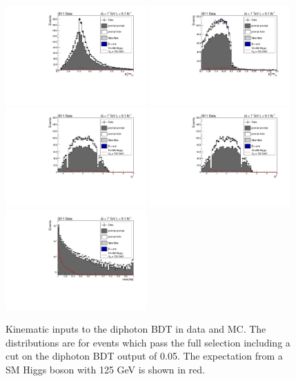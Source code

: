 \begin{figure}[hbt!]
  \includegraphics[width=0.48\textwidth]{hgg7TeV/variablePlots/pt_1om}
  \includegraphics[width=0.48\textwidth]{hgg7TeV/variablePlots/pt_2om}\\
  \includegraphics[width=0.48\textwidth]{hgg7TeV/variablePlots/phoeta_1}
  \includegraphics[width=0.48\textwidth]{hgg7TeV/variablePlots/phoeta_2}\\
  \includegraphics[width=0.48\textwidth]{hgg7TeV/variablePlots/cosdphi}
 \caption{Kinematic inputs to the diphoton BDT in data and MC. 
	  The distributions are for events which pass the full selection 
	  including a cut on the diphoton BDT output of 0.05.
 	  The expectation from a SM Higgs boson with 125 GeV is shown in red.}
 \label{fig:diphotonbdtvars1}
\end{figure}

